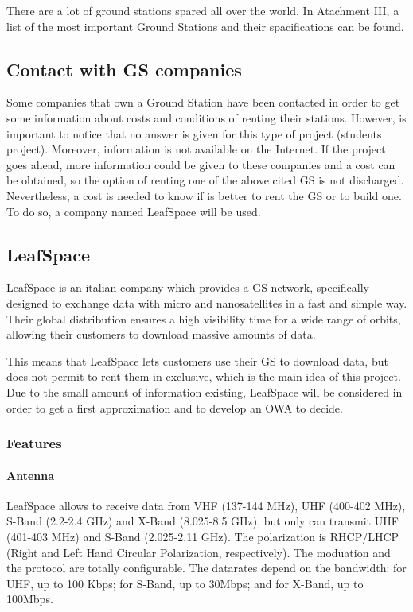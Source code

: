 There are a lot of ground stations spared all over the world. In Atachment III, a list of the most important Ground Stations and their spacifications can be found.

\subsection{Contact with GS companies}
Some companies that own a Ground Station have been contacted in order to get some information about costs and conditions of renting their stations. However, is important to notice that no answer is given for this type of project (students project). Moreover, information is not available on the Internet. If the project goes ahead, more information could be given to these companies and a cost can be obtained, so the option of renting one of the above cited GS is not discharged. Nevertheless, a cost is needed to know if is better to rent the GS or to build one. To do so, a company named LeafSpace will be used.

\subsection{LeafSpace}
LeafSpace is an italian company which provides a GS network, specifically designed to exchange data with micro and nanosatellites in a fast and simple way. Their global distribution ensures a high visibility time for a wide range of orbits, allowing their customers to download massive amounts of data.

This means that LeafSpace lets customers use their GS to download data, but does not permit to rent them in exclusive, which is the main idea of this project. Due to the small amount of information existing, LeafSpace will be considered in order to get a first approximation and to develop an OWA to decide. 

\subsubsection{Features}
\paragraph{Antenna}
LeafSpace allows to receive data from VHF (137-144 MHz), UHF (400-402 MHz), S-Band (2.2-2.4 GHz) and X-Band (8.025-8.5 GHz), but only can transmit UHF (401-403 MHz) and S-Band (2.025-2.11 GHz). The polarization is RHCP/LHCP (Right and Left Hand Circular Polarization, respectively). The moduation and the protocol are totally configurable. The datarates depend on the bandwidth: for UHF, up to 100 Kbps; for S-Band, up to 30Mbps; and for X-Band, up to 100Mbps. 

